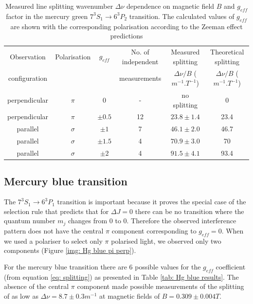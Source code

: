 \documentclass[11pt]{article}
\begin{document}
\begin{table}[h!]
    \centering
    \begin{tabular}{c|ccccc}
    \toprule
        Observation & Polarisation  & \( g_{eff} \) & No. of independent & Measured splitting  & Theoretical splitting \\
        configuration & & & measurements & $\Delta \nu / B$ ($\si{m^{-1}.T^{-1}}$) & $\Delta \nu / B$ ($\si{m^{-1}.T^{-1}}$) \\
    \midrule
        perpendicular & \( \pi \) & 0 & - & no splitting & 0\\
        perpendicular & \( \pi \) & $\pm 0.5$ & 12 & $23.8 \pm 1.4$ & 23.4\\
        parallel & \( \sigma \) & $\pm 1$ & 7 & $46.1 \pm 2.0$ & 46.7\\
        parallel & \( \sigma \) & $\pm 1.5$ & 4 & $70.9 \pm 3.0$ & 70\\
        parallel & \( \sigma \) & $\pm 2$ & 4 & $91.5 \pm 4.1$ & 93.4\\
    \bottomrule
  \end{tabular}
    \captionsetup{justification=centering}
  \caption{Measured line splitting wavenumber $\Delta \nu$ dependence on magnetic field $B$ and $g_{eff}$ factor in the mercury green $7^3 S_1\rightarrow 6^3 P_2$ transition. The calculated values of \(g_{eff}\) are shown with the corresponding polarisation according to the Zeeman effect predictions}
  \label{tab: Hg green results}
\end{table}

\subsection{Mercury blue transition} \label{sec: Hg blue}
The $7^3 S_1 \rightarrow 6^3 P_1$ transition is important because it proves the special case of the selection rule that predicts that for $\Delta J = 0$ there can be no transition where the quantum number $m_j$ changes from 0 to 0. Therefore the observed interference pattern does not have the central $\pi$ component corresponding to $g_{eff} = 0$. When we used a polariser to select only $\pi$ polarised light, we observed only two components (Figure \ref{img: Hg blue pi perp}). 

For the mercury blue transition there are 6 possible values for the $g_{eff}$ coefficient (from equation \eqref{eq: splitting}) as presented in Table \ref{tab: Hg blue results}. The absence of the central $\pi$ component made possible measurements of the splitting of as low as $\Delta \nu = 8.7 \pm 0.3 \si{m^{-1}}$ at magnetic fields of $B = 0.309 \pm 0.004 \si{T}$. 
\end{document}
